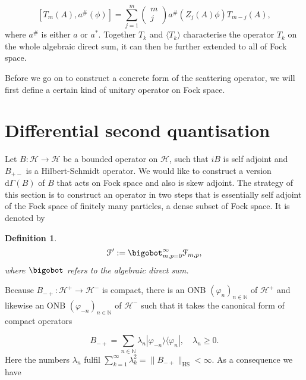 \documentclass[b5paper,draft,openbib,12pt]{memoir}
\newtheorem{Def}{Definition}[section]
\begin{document}
\begin{equation}\label{logarithmic lift condition}
\left[T_m(A) , a^\# (\phi)\right]= \sum_{j=1}^{m} \begin{pmatrix} m \\ j \end{pmatrix} a^\# \left(Z_j (A) \phi \right) T_{m-j}(A), 
\end{equation}
where \(a^\#\) is either \(a\) or \(a^*\). Together \(T_k\) and \(\langle T_k\rangle\) characterise the operator \(T_k\) on the whole algebraic
direct sum, it can then be further extended to all of Fock space.

Before we go on to construct a concrete form of the scattering operator, we will first define a certain kind of unitary operator on Fock space.

\section{Differential second quantisation}

Let \(B:\mathcal{H}\rightarrow\mathcal{H}\) be a bounded
operator on \(\mathcal{H}\), such that \(i B\) is self adjoint and \(B_{+-}\) is a Hilbert-Schmidt operator. 
We would like to construct a version \(\mathrm{d}\Gamma(B)\) of \(B\) that acts on Fock space and also is skew adjoint.
The strategy of this section is to construct an operator in two steps that is essentially self adjoint of the Fock space of 
finitely many particles, a dense subset of Fock space. It is denoted by

\begin{Def}
\begin{equation}
\mathcal{F}':=\bigobot_{m,p=0}^\infty \mathcal{F}_{m,p},
\end{equation}
where \(\bigobot\) refers to the algebraic direct sum.
\end{Def}
Because \(B_{-+}:\mathcal{H}^+\rightarrow \mathcal{H}^-\) is compact, there is an ONB \((\varphi_n)_{n\in\mathbb{N}}\) 
of \(\mathcal{H}^+\) and likewise an ONB \((\varphi_{-n})_{n\in\mathbb{N}}\) of \(\mathcal{H}^-\) such that it takes the canonical form 
of compact operators

\begin{equation}
B_{-+} = \sum_{n\in\mathbb{N}} \lambda_n |\varphi_{-n}\rangle \langle \varphi_{n}|, \quad \lambda_n \ge 0.
\end{equation}
Here the numbers \(\lambda_n\) fulfil \(\sum_{k=1}^\infty \lambda_k^2 = \|B_{-+}\|_{\text{HS}}<\infty\). As a consequence we have
\end{document}
